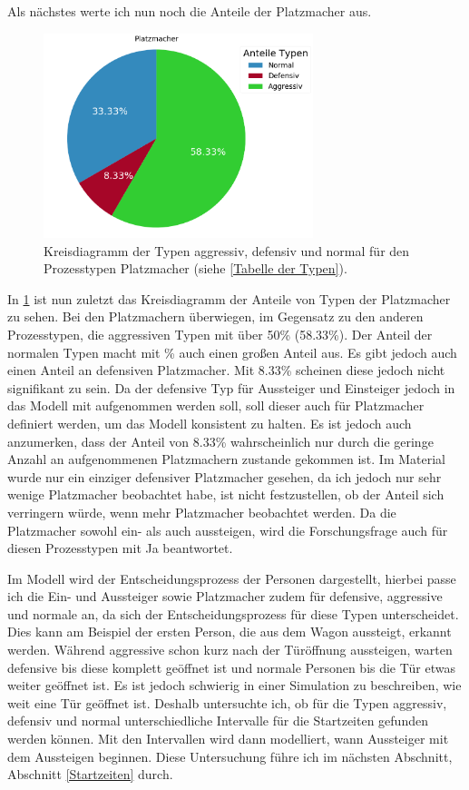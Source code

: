 Als nächstes werte ich nun noch die Anteile der Platzmacher aus.
\begin{figure}[H]
	\centering
		\includegraphics[width=0.7\textwidth]{pictures/data_evaluation/types/proportions_Platzmacher.png}
	\caption{Kreisdiagramm der Typen aggressiv, defensiv und normal für den Prozesstypen Platzmacher (siehe \ref{Tabelle der Typen}).}
	\label{fig:AnteileTypenPlatzmacher}
\end{figure}
In \figurename \ref{fig:AnteileTypenPlatzmacher} ist nun zuletzt das Kreisdiagramm der Anteile von Typen der Platzmacher zu sehen. Bei den Platzmachern überwiegen, im Gegensatz zu den anderen Prozesstypen, die aggressiven Typen mit über 50\% (58.33\%). Der Anteil der normalen Typen macht mit \%  auch einen großen Anteil aus. Es gibt jedoch auch einen Anteil an defensiven Platzmacher. Mit 8.33\% scheinen diese jedoch nicht signifikant zu sein. Da der defensive Typ für Aussteiger und Einsteiger jedoch in das Modell mit aufgenommen werden soll, soll dieser auch für Platzmacher definiert werden, um das Modell konsistent zu halten. Es ist jedoch auch anzumerken, dass der Anteil von 8.33\% wahrscheinlich nur durch die geringe Anzahl an aufgenommenen Platzmachern zustande gekommen ist. Im Material wurde nur ein einziger defensiver Platzmacher gesehen, da ich jedoch nur sehr wenige Platzmacher beobachtet habe, ist nicht festzustellen, ob der Anteil sich verringern würde, wenn mehr Platzmacher beobachtet werden. Da die Platzmacher sowohl ein- als auch aussteigen, wird die Forschungsfrage auch für diesen Prozesstypen mit Ja beantwortet. 

Im Modell wird der Entscheidungsprozess der Personen dargestellt, hierbei passe ich die Ein- und Aussteiger sowie Platzmacher zudem für defensive, aggressive und normale an, da sich der Entscheidungsprozess für diese Typen unterscheidet. Dies kann am Beispiel der ersten Person, die aus dem Wagon aussteigt, erkannt werden. Während aggressive schon kurz nach der Türöffnung aussteigen, warten defensive bis diese komplett geöffnet ist und normale Personen bis die Tür etwas weiter geöffnet ist. Es ist jedoch schwierig in einer Simulation zu beschreiben, wie weit eine Tür geöffnet ist. Deshalb untersuchte ich, ob für die Typen aggressiv, defensiv und normal unterschiedliche Intervalle für die Startzeiten gefunden werden können. Mit den Intervallen wird dann modelliert, wann Aussteiger mit dem Aussteigen beginnen. Diese Untersuchung führe ich im nächsten Abschnitt, Abschnitt \ref{Startzeiten} durch.

